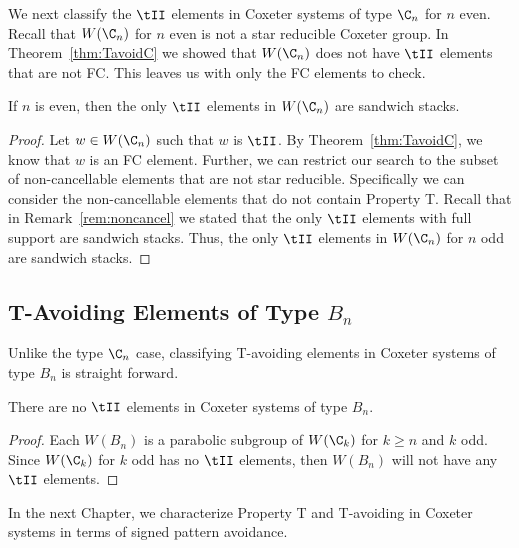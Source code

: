 We next classify the $\tII$ elements in Coxeter systems of type $\C_n$ for $n$ even. Recall that $W(\C_n)$ for $n$ even is not a star reducible Coxeter group. In Theorem~\ref{thm:TavoidC} we showed that $W(\C_n)$ does not have $\tII$ elements that are not FC. This leaves us with only the FC elements to check.

\begin{theorem}
	If $n$ is even, then the only $\tII$ elements in $W(\C_n)$ are sandwich stacks.
	\begin{proof}
		Let $w \in W(\C_n)$ such that $w$ is $\tII$. By Theorem~\ref{thm:TavoidC}, we know that $w$ is an FC element. Further, we can restrict our search to the subset of non-cancellable elements that are not star reducible. Specifically we can consider the non-cancellable elements that do not contain Property T. Recall that in Remark~\ref{rem:noncancel} we stated that the only $\tII$ elements with full support are sandwich stacks. Thus, the only $\tII$ elements in $W(\C_n)$ for $n$ odd are sandwich stacks.
	\end{proof}
\end{theorem}

\subsection{T-Avoiding Elements of Type $B_n$}\label{sec:typeB}

Unlike the type $\C_n$ case, classifying T-avoiding elements in Coxeter systems of type $B_n$ is straight forward. 

\begin{theorem}\label{thm:typeB}
There are no $\tII$ elements in Coxeter systems of type $B_n$.
\begin{proof}
	Each $W(B_n)$ is a parabolic subgroup of $W(\C_k)$ for $k \geq n$ and $k$ odd. Since $W(\C_k)$ for $k$ odd has no $\tII$ elements, then $W(B_n)$ will not have any $\tII$ elements.
\end{proof}
\end{theorem}
   
In the next Chapter, we characterize Property T and T-avoiding in Coxeter systems in terms of signed pattern avoidance.   